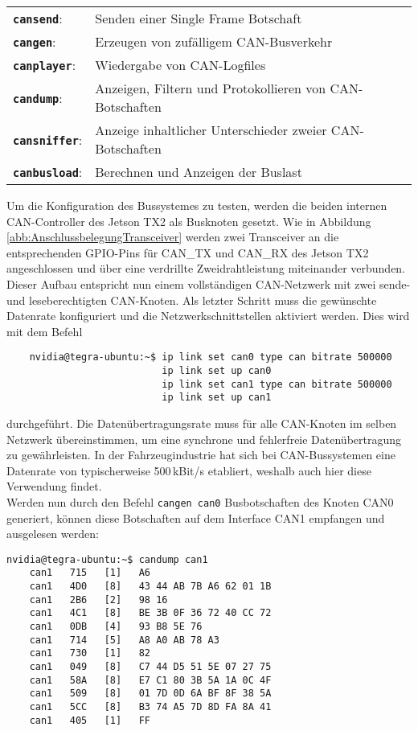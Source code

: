 \renewcommand{\arraystretch}{1.5}
\begin{tabular}{l l}
	\texttt{\textbf{cansend}}: & Senden einer Single Frame Botschaft\\
	\texttt{\textbf{cangen}}: & Erzeugen von zufälligem CAN-Busverkehr\\
	\texttt{\textbf{canplayer}}: & Wiedergabe von CAN-Logfiles\\
	\texttt{\textbf{candump}}: & Anzeigen, Filtern und Protokollieren von CAN-Botschaften\\
	\texttt{\textbf{cansniffer}}: & Anzeige inhaltlicher Unterschieder zweier CAN-Botschaften\\
	\texttt{\textbf{canbusload}}: & Berechnen und Anzeigen der Buslast
\end{tabular}

Um die Konfiguration des Bussystemes zu testen, werden die beiden internen CAN-Controller des Jetson TX2 als Busknoten gesetzt. Wie in Abbildung \ref{abb:AnschlussbelegungTransceiver} werden zwei Transceiver an die entsprechenden GPIO-Pins für CAN\_TX und CAN\_RX des Jetson TX2 angeschlossen und über eine verdrillte Zweidrahtleistung miteinander verbunden. Dieser Aufbau entspricht nun einem vollständigen CAN-Netzwerk mit zwei sende- und leseberechtigten CAN-Knoten.
Als letzter Schritt muss die gewünschte Datenrate konfiguriert und die Netzwerkschnittstellen aktiviert werden. Dies wird mit dem Befehl 
 
	\begin{verbatim}
	nvidia@tegra-ubuntu:~$ ip link set can0 type can bitrate 500000
	                       ip link set up can0
	                       ip link set can1 type can bitrate 500000
	                       ip link set up can1
	\end{verbatim}

durchgeführt. Die Datenübertragungsrate muss für alle CAN-Knoten im selben Netzwerk übereinstimmen, um eine synchrone und fehlerfreie Datenübertragung zu gewährleisten. In der Fahrzeugindustrie hat sich bei CAN-Bussystemen eine Datenrate von typischerweise 500\,kBit/s etabliert, weshalb auch hier diese Verwendung findet.\\
Werden nun durch den Befehl \texttt{cangen can0} Busbotschaften des Knoten CAN0 generiert, können diese Botschaften auf dem Interface CAN1 empfangen und ausgelesen werden:

\begin{addmargin}[1cm]{0cm} 
\begin{verbatim}
nvidia@tegra-ubuntu:~$ candump can1
    can1   715   [1]   A6
    can1   4D0   [8]   43 44 AB 7B A6 62 01 1B
    can1   2B6   [2]   98 16
    can1   4C1   [8]   BE 3B 0F 36 72 40 CC 72
    can1   0DB   [4]   93 B8 5E 76
    can1   714   [5]   A8 A0 AB 78 A3
    can1   730   [1]   82
    can1   049   [8]   C7 44 D5 51 5E 07 27 75
    can1   58A   [8]   E7 C1 80 3B 5A 1A 0C 4F
    can1   509   [8]   01 7D 0D 6A BF 8F 38 5A
    can1   5CC   [8]   B3 74 A5 7D 8D FA 8A 41
    can1   405   [1]   FF

\end{verbatim}
\end{addmargin}

